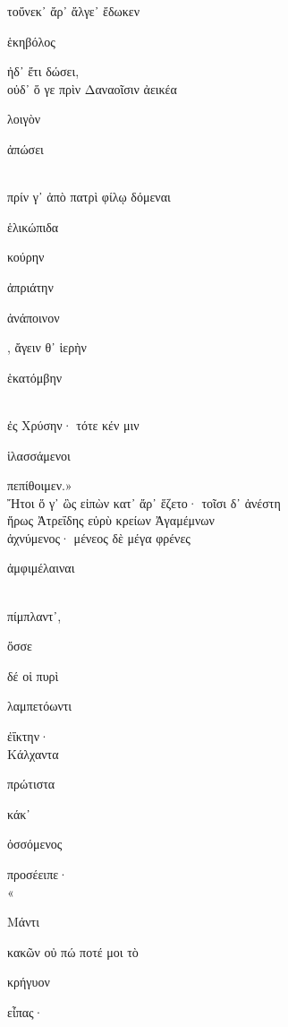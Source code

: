 \documentclass{ransom}
\begin{document}
\renewcommand{\rightheaderwhat}{\rightheaderwhatglosses}%
\begin{foreignpage}
\begin{graytext}
τοὔνεκ᾽ ἄρ᾽ ἄλγε᾽ ἔδωκεν \begin{whitetext}ἑκηβόλος\end{whitetext} ἠδ᾽ ἔτι δώσει,\\
οὐδ᾽ ὅ γε πρὶν Δαναοῖσιν ἀεικέα \begin{whitetext}λοιγὸν\end{whitetext} \begin{whitetext}ἀπώσει\end{whitetext}\\
πρίν γ᾽ ἀπὸ πατρὶ φίλῳ δόμεναι \begin{whitetext}ἑλικώπιδα\end{whitetext} κούρην\\
\begin{whitetext}ἀπριάτην\end{whitetext} \begin{whitetext}ἀνάποινον\end{whitetext}, ἄγειν θ᾽ ἱερὴν \begin{whitetext}ἑκατόμβην\end{whitetext}\\
ἐς Χρύσην· τότε κέν μιν \begin{whitetext}ἱλασσάμενοι\end{whitetext} πεπίθοιμεν.»\hfill{}\\
Ἤτοι ὅ γ᾽ ὣς εἰπὼν κατ᾽ ἄρ᾽ ἕζετο· τοῖσι δ᾽ ἀνέστη\\
ἥρως Ἀτρεΐδης εὐρὺ κρείων Ἀγαμέμνων\\
ἀχνύμενος· μένεος δὲ μέγα φρένες \begin{whitetext}ἀμφιμέλαιναι\end{whitetext}\\
πίμπλαντ᾽, \begin{whitetext}ὄσσε\end{whitetext} δέ οἱ πυρὶ \begin{whitetext}λαμπετόωντι\end{whitetext} ἐΐκτην·\\
Κάλχαντα \begin{whitetext}πρώτιστα\end{whitetext} κάκ᾽ \begin{whitetext}ὀσσόμενος\end{whitetext} προσέειπε·\hfill{}\\
«\begin{whitetext}Μάντι\end{whitetext} κακῶν οὐ πώ ποτέ μοι τὸ \begin{whitetext}κρήγυον\end{whitetext} εἶπας·\\

\end{graytext}
\end{foreignpage}
\end{document}
